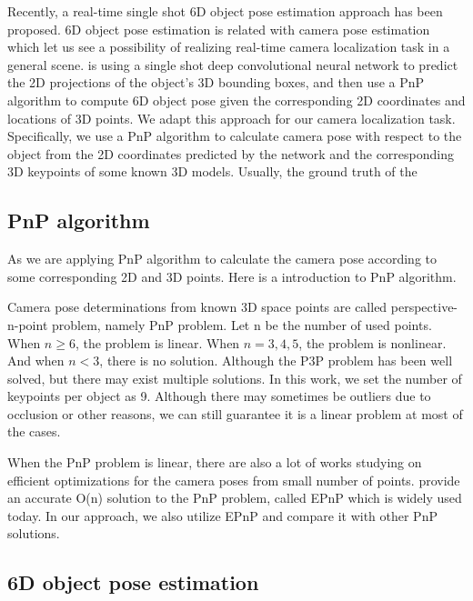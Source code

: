 Recently, a real-time single shot 6D object pose estimation approach \cite{tekin2018real} has been proposed. 6D object pose estimation is related with camera pose estimation which let us see a possibility of realizing real-time camera localization task in a general scene. \cite{tekin2018real} is using a single shot deep convolutional neural network to predict the 2D projections of the object's 3D bounding boxes, and then use a PnP algorithm to compute 6D object pose given the corresponding 2D coordinates and locations of 3D points. We adapt this approach for our camera localization task. Specifically, we use a PnP algorithm to calculate camera pose with respect to the object from the 2D coordinates predicted by the network and the corresponding 3D keypoints of some known 3D models. Usually, the ground truth of the %

\subsection{PnP algorithm}

As we are applying PnP algorithm to calculate the camera pose according to some corresponding 2D and 3D points. Here is a introduction to PnP algorithm.

Camera pose determinations from known 3D space points are called perspective-n-point problem, namely PnP problem. Let n be the number of used points. When $n \geq 6$, the problem is linear. When $n = 3,4,5$, the problem is nonlinear. And when $n < 3$, there is no solution. Although the P3P problem has been well solved, but there may exist multiple solutions. In this work, we set the number of keypoints per object as 9. Although there may sometimes be outliers due to occlusion or other reasons, we can still guarantee it is a linear problem at most of the cases.

When the PnP problem is linear, there are also a lot of works studying on efficient optimizations for the camera poses from small number of points. \cite{lepetit2009epnp} provide an accurate O(n) solution to the PnP problem, called EPnP which is widely used today. In our approach, we also utilize EPnP and compare it with other PnP solutions.

\subsection{6D object pose estimation}

